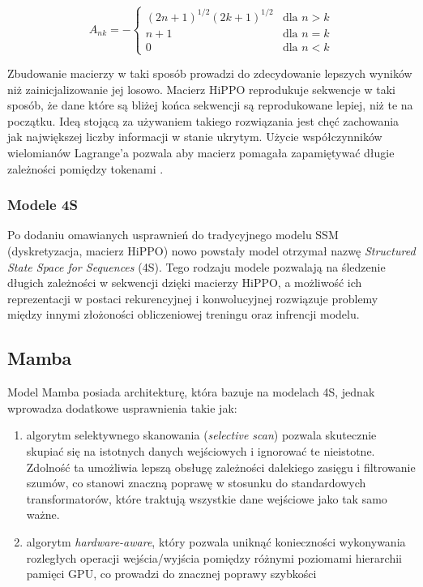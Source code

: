 \documentclass[data-science]{agh-wi} %
\begin{document}
\begin{equation}
    A_{nk} = -
    \begin{cases}
        (2n + 1)^{1/2} (2k + 1)^{1/2} & \text{dla } n > k \\
        n + 1                         & \text{dla } n = k \\
        0                             & \text{dla } n < k
    \end{cases}
    \label{equ:hippo_matrix}
\end{equation}

Zbudowanie macierzy w taki sposób prowadzi do zdecydowanie lepszych wyników niż zainicjalizowanie jej losowo. Macierz HiPPO reprodukuje sekwencje w taki sposób, że dane które są bliżej końca sekwencji są reprodukowane lepiej, niż te na początku. Ideą stojącą za używaniem takiego rozwiązania jest chęć zachowania jak największej liczby informacji w stanie ukrytym. Użycie współczynników wielomianów Lagrange'a pozwala aby macierz pomagała zapamiętywać długie zależności pomiędzy tokenami \cite{lagrange}.

\subsubsection*{Modele 4S}
Po dodaniu omawianych usprawnień do tradycyjnego modelu SSM (dyskretyzacja, macierz HiPPO) nowo powstały model otrzymał nazwę \textit{Structured State Space for Sequences} (4S). Tego rodzaju modele pozwalają na śledzenie długich zależności w sekwencji dzięki macierzy HiPPO, a możliwość ich reprezentacji w postaci rekurencyjnej i konwolucyjnej rozwiązuje problemy między innymi złożoności obliczeniowej treningu oraz infrencji modelu.

\subsection{Mamba}
Model Mamba posiada architekturę, która bazuje na modelach 4S, jednak wprowadza dodatkowe usprawnienia takie jak:
\begin{enumerate}
    \item algorytm selektywnego skanowania (\textit{selective scan}) pozwala skutecznie skupiać się na istotnych danych wejściowych i ignorować te nieistotne. Zdolność ta umożliwia lepszą obsługę zależności dalekiego zasięgu i filtrowanie szumów, co stanowi znaczną poprawę w stosunku do standardowych transformatorów, które traktują wszystkie dane wejściowe jako tak samo ważne.
    \item algorytm \textit{hardware-aware}, który pozwala uniknąć konieczności wykonywania rozległych operacji wejścia/wyjścia pomiędzy różnymi poziomami hierarchii pamięci GPU, co prowadzi do znacznej poprawy szybkości
\end{enumerate}
\end{document}
